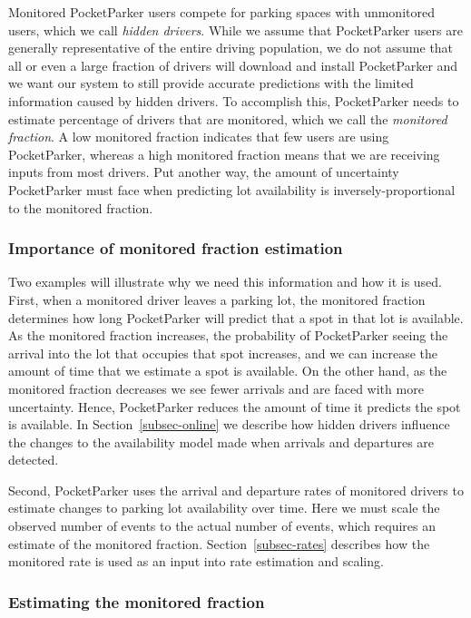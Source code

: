 Monitored PocketParker users compete for parking spaces with unmonitored
users, which we call \textit{hidden drivers}. While we assume that
PocketParker users are generally representative of the entire driving
population, we do not assume that all or even a large fraction of drivers
will download and install PocketParker and we want our system to still
provide accurate predictions with the limited information caused by hidden
drivers. To accomplish this, PocketParker needs to estimate percentage of
drivers that are monitored, which we call the \textit{monitored fraction}. A
low monitored fraction indicates that few users are using PocketParker,
whereas a high monitored fraction means that we are receiving inputs from
most drivers. Put another way, the amount of uncertainty PocketParker must
face when predicting lot availability is inversely-proportional to the
monitored fraction.

\subsubsection{Importance of monitored fraction estimation}

Two examples will illustrate why we need this information and how it is used.
First, when a monitored driver leaves a parking lot, the monitored fraction
determines how long PocketParker will predict that a spot in that lot is
available. As the monitored fraction increases, the probability of
PocketParker seeing the arrival into the lot that occupies that spot
increases, and we can increase the amount of time that we estimate a spot is
available. On the other hand, as the monitored fraction decreases we see
fewer arrivals and are faced with more uncertainty. Hence, PocketParker
reduces the amount of time it predicts the spot is available. In
Section~\ref{subsec-online} we describe how hidden drivers influence the
changes to the availability model made when arrivals and departures are
detected.

Second, PocketParker uses the arrival and departure rates of monitored
drivers to estimate changes to parking lot availability over time. Here we
must scale the observed number of events to the actual number of events,
which requires an estimate of the monitored fraction.
Section~\ref{subsec-rates} describes how the monitored rate is used as an
input into rate estimation and scaling.

\subsubsection{Estimating the monitored fraction}
\label{subsubsec-monitored}

